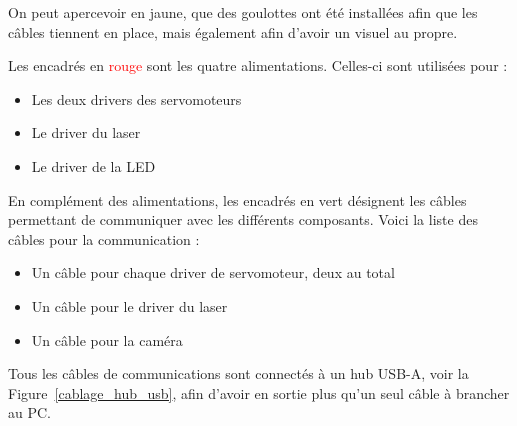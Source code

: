 On peut apercevoir en \textcolor[RGB]{230, 230, 0}{jaune}, que des goulottes ont été installées afin que les câbles tiennent en place, mais également afin d'avoir un visuel au propre.

Les encadrés en \textcolor{red}{rouge} sont les quatre alimentations. Celles-ci sont utilisées pour :
\begin{itemize}[label=\textbullet]
    \item Les deux drivers des servomoteurs
    \item Le driver du laser
    \item Le driver de la LED
\end{itemize}
\vspace{0.5em}
En complément des alimentations, les encadrés en \textcolor[RGB]{0, 201, 18}{vert} désignent les câbles permettant de communiquer avec les différents composants. Voici la liste des câbles pour la communication :
\begin{itemize}[label=\textbullet]
    \item Un câble pour chaque driver de servomoteur, deux au total
    \item Un câble pour le driver du laser
    \item Un câble pour la caméra
\end{itemize}
\vspace{0.5em}
Tous les câbles de communications sont connectés à un hub USB-A, voir la Figure~\ref{cablage_hub_usb}, afin d'avoir en sortie plus qu'un seul câble à brancher au PC.